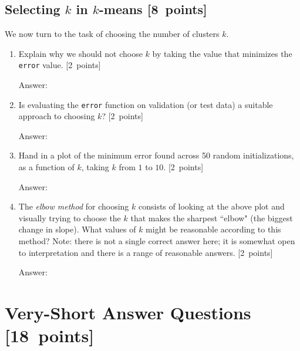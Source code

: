 \documentclass{article}
\newcommand{\blu}[1]{{\textcolor{blu}{#1}}}
\newenvironment{answer}{\par\begingroup\color{gre}Answer: }{\endgroup}
\let\ask\blu
\newcommand\pts[1]{\textcolor{pointscolour}{[#1~points]}}
\begin{document}
    \clearpage
    \subsection{Selecting $k$ in $k$-means \pts{8}}

    We now turn to the task of choosing the number of clusters $k$.

    \begin{enumerate}
        \item \ask{Explain why we should not choose $k$ by taking the value that minimizes the \texttt{error} value.} \pts{2}
        \begin{answer}

        \end{answer}
        \item \ask{Is evaluating the \texttt{error} function on validation (or test data) a suitable approach to choosing $k$?} \pts{2}
        \begin{answer}

        \end{answer}
        \item \ask{Hand in a plot of the minimum error found across 50 random initializations, as a function of $k$, taking $k$ from $1$ to $10$.} \pts{2}
        \begin{answer}

        \end{answer}
        \item The \emph{elbow method} for choosing $k$ consists of looking at the above plot and visually trying to choose the $k$ that makes the sharpest ``elbow" (the biggest change in slope). \ask{What values of $k$ might be reasonable according to this method?} Note: there is not a single correct answer here; it is somewhat open to interpretation and there is a range of reasonable answers. \pts{2}
        \begin{answer}

        \end{answer}
    \end{enumerate}

    \clearpage
    \section{Very-Short Answer Questions \pts{18}}
\end{document}
